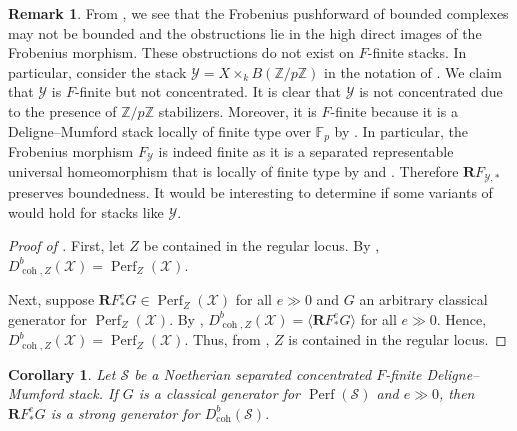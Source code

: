 \documentclass[11pt]{amsart}
\theoremstyle{plain}
\newtheorem{corollary}[theorem]{Corollary}
\theoremstyle{definition}
\newtheorem{remark}[theorem]{Remark}
\numberwithin{equation}{section}
\numberwithin{theorem}{section}
\begin{document}
\begin{remark}\label{ex:F-finite_non_tame_maybe}
    From , we see that the Frobenius pushforward of bounded complexes may not be bounded and the obstructions lie in the high direct images of the Frobenius morphism. 
    These obstructions do not exist on $F$-finite stacks. 
    In particular, consider the stack $\mathcal{Y}=X\times_k B(\mathbb{Z}/p\mathbb{Z})$ in the notation of . 
    We claim that $\mathcal{Y}$ is $F$-finite but not concentrated. 
    It is clear that $\mathcal{Y}$ is not concentrated due to the presence of $\mathbb{Z}/p\mathbb{Z}$ stabilizers. 
    Moreover, it is $F$-finite because it is a Deligne--Mumford stack locally of finite type over $\mathbb{F}_p$ by . 
    In particular, the Frobenius morphism $F_\mathcal{Y}$ is indeed finite as it is a separated representable universal homeomorphism that is locally of finite type by  and  . Therefore $\mathbf{R}F_{\mathcal{Y},\ast}$ preserves boundedness. 
    It would be interesting to determine if some variants of  would hold for stacks like $\mathcal{Y}$.
\end{remark}

\begin{proof}
    [Proof of ]
    First, let $Z$ be contained in the regular locus. 
    By \cite[Proposition 3.6]{DeDeyn/Lank/ManaliRahul/Peng:2025}, $D^b_{\operatorname{coh},Z}(\mathcal{X})=\operatorname{Perf}_Z (\mathcal{X})$.  

    Next, suppose $\mathbf{R} F_\ast^e G\in \operatorname{Perf}_Z (\mathcal{X})$ for all $e \gg 0$ and $G$ an arbitrary classical generator for $\operatorname{Perf}_Z (\mathcal{X})$. 
    By , $D^b_{\operatorname{coh},Z}(\mathcal{X}) = \langle \mathbf{R} F_\ast^e G \rangle$ for all $e\gg 0$. 
    Hence, $D^b_{\operatorname{coh},Z}(\mathcal{X})=\operatorname{Perf}_Z (\mathcal{X})$. 
    Thus, from \cite[Proposition 3.6]{DeDeyn/Lank/ManaliRahul/Peng:2025}, $Z$ is contained in the regular locus.
\end{proof}

\begin{corollary}
    \label{cor:strong_frobenius_generator}
    Let $\mathcal{S}$ be a Noetherian separated concentrated $F$-finite Deligne--Mumford stack. 
    If $G$ is a classical generator for $\operatorname{Perf}(\mathcal{S})$ and $e\gg 0$, then $\mathbf{R}F_\ast^e G$ is a strong generator for $D^b_{\operatorname{coh}}(\mathcal{S})$. 
\end{corollary}
\end{document}
